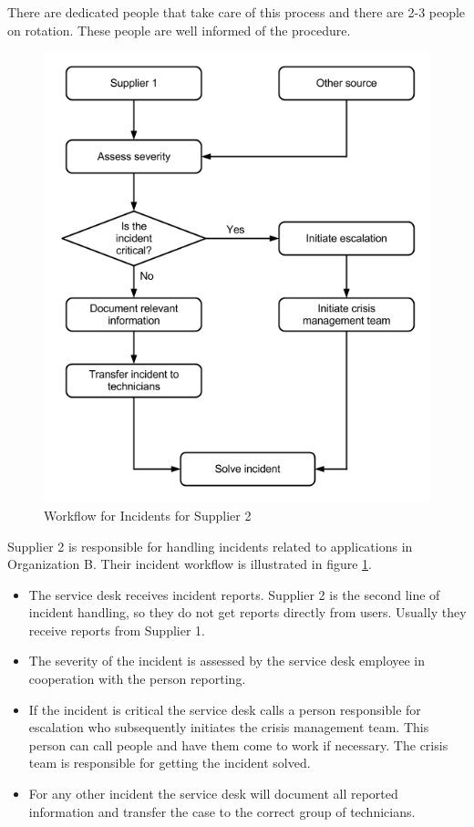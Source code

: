 There are dedicated people that take care of this process and there are 2-3 people on rotation. These people are well informed of the procedure.  

\begin{figure}[H]
\begin{center}
\includegraphics[scale=0.57]{WorkflowCaseBSupplier2.png}
\caption[Workflow for Incidents, Case B Supplier 2]{Workflow for Incidents for Supplier 2}
\label{fig:WorkflowCaseBSupplier2}
\end{center}
\end{figure}

Supplier 2 is responsible for handling incidents related to applications in Organization B. Their incident workflow is illustrated in figure \ref{fig:WorkflowCaseBSupplier2}.

\begin{itemize}
\item The service desk receives incident reports. Supplier 2 is the second line of incident handling, so they do not get reports directly from users. Usually they receive reports from Supplier 1.
\item The severity of the incident is assessed by the service desk employee in cooperation with the person reporting.
\item If the incident is critical the service desk calls a person responsible for escalation who subsequently initiates the crisis management team. This person can call people and have them come to work if necessary. The crisis team is responsible for getting the incident solved.
\item For any other incident the service desk will document all reported information and transfer the case to the correct group of technicians.
\end{itemize}

